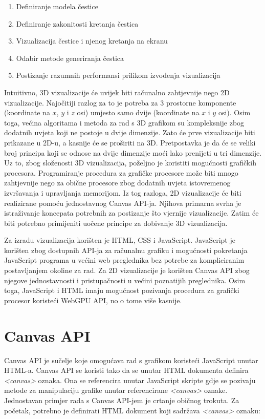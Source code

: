 \documentclass{foi}
\begin{document}
\begin{enumerate}
  \item Definiranje modela čestice  
  \item Definiranje zakonitosti kretanja čestica
  \item Vizualizacija čestice i njenog kretanja na ekranu
  \item Odabir metode generiranja čestica
  \item Postizanje razumnih performansi prilikom izvođenja vizualizacija
\end{enumerate}

Intuitivno, 3D vizualizacije će uvijek biti računalno zahtjevnije nego 2D vizualizacije. Najočitiji razlog za to je potreba za 3 prostorne komponente (koordinate na $x$, $y$ i $z$ osi) umjesto samo dvije (koordinate na $x$ i $y$ osi). Osim toga, većina algoritama i metoda za rad s 3D grafikom su kompleksnije zbog dodatnih uvjeta koji ne postoje u dvije dimenzije. Zato će prve vizualizacije biti prikazane u 2D-u, a kasnije će se proširiti na 3D. Pretpostavka je da će se veliki broj principa koji se odnose na dvije dimenzije moći lako prenijeti u tri dimenzije. Uz to, zbog složenosti 3D vizualizacija, poželjno je koristiti mogućnosti grafičkih procesora. Programiranje procedura za grafičke procesore može biti mnogo zahtjevnije nego za obične procesore zbog dodatnih uvjeta istovremenog izvršavanja i upravljanja memorijom. Iz tog razloga, 2D vizualizacije će biti realizirane pomoću jednostavnog Canvas API-ja. Njihova primarna svrha je istraživanje koncepata potrebnih za postizanje što vjernije vizualizacije. Zatim će biti potrebno primijeniti uočene principe za dobivanje 3D vizualizacija. 

Za izradu vizualizacija korišten je HTML, CSS i JavaScript. JavaScript je korišten zbog dostupnih API-ja za računalnu grafiku i mogućnosti pokretanja JavaScript programa u većini web preglednika bez potrebe za kompliciranim postavljanjem okoline za rad. Za 2D vizualizacije je korišten Canvas API zbog njegove jednostavnosti i pristupačnosti u većini poznatijih preglednika. Osim toga, JavaScript i HTML imaju mogućnost pozivanja procedura za grafički procesor koristeći WebGPU API, no o tome više kasnije. 


\section{Canvas API}
Canvas API je sučelje koje omogućava rad s grafikom koristeći JavaScript unutar HTML-a. Canvas API se koristi tako da se unutar HTML dokumenta definira \textit{<canvas>} oznaka. Ona se referencira unutar JavaScript skripte gdje se pozivaju metode za manipulaciju grafike unutar referencirane \textit{<canvas>} oznake. Jednostavan primjer rada s Canvas API-jem je crtanje običnog trokuta. Za početak, potrebno je definirati HTML dokument koji sadržava \textit{<canvas>} oznaku:
\end{document}
